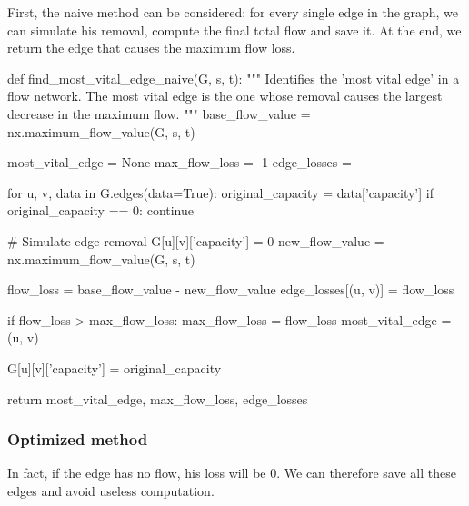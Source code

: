 \documentclass[12pt, openany]{article}
\begin{document}
First, the naive method can be considered: for every single edge in the graph, we can simulate his removal, compute the final total flow and save it. At the end, we return the edge that causes the maximum flow loss.

\begin{python}[caption={Python code for the naive approach in order to identify the most vital edge},  label={lst:2_naive_method_lst}]
def find_most_vital_edge_naive(G, s, t):
    """
    Identifies the 'most vital edge' in a flow network.
    The most vital edge is the one whose removal causes the largest decrease in the maximum flow.
    """
    base_flow_value = nx.maximum_flow_value(G, s, t)
    
    most_vital_edge = None
    max_flow_loss = -1
    edge_losses = {}
    
    for u, v, data in G.edges(data=True):
        original_capacity = data['capacity']
        if original_capacity == 0: continue
            
        # Simulate edge removal
        G[u][v]['capacity'] = 0
        new_flow_value = nx.maximum_flow_value(G, s, t)
        
        flow_loss = base_flow_value - new_flow_value
        edge_losses[(u, v)] = flow_loss
        
        if flow_loss > max_flow_loss:
            max_flow_loss = flow_loss
            most_vital_edge = (u, v)
            
        G[u][v]['capacity'] = original_capacity
        
    return most_vital_edge, max_flow_loss, edge_losses
\end{python}

\subsubsection{Optimized method}\label{sec:2_optimized_method}

In fact, if the edge has no flow, his loss will be $0$. We can therefore save all these edges and avoid useless computation.
\end{document}
